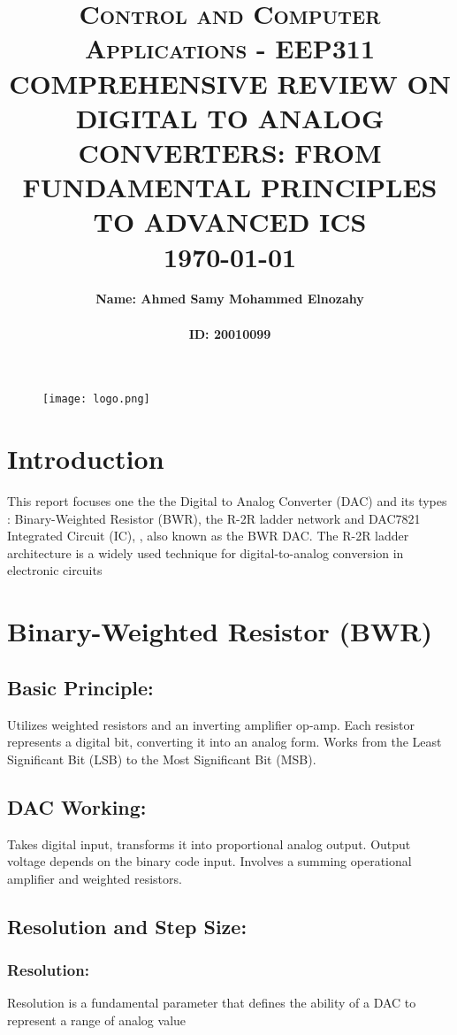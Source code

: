 \documentclass{article}
\title{ \normalsize \textsc{Control and Computer Applications - EEP311}
		\\ [2.0cm]
		\HRule{4pt} 
		\LARGE \textbf{\uppercase{Comprehensive Review on Digital to Analog Converters: From Fundamental Principles to Advanced ICs}}
		\HRule{2pt} \\[0.5cm]
		\normalsize \today \vspace*{5\baselineskip}}
\date{}
\author{
\fontsize{14}{16}\selectfont\textbf{Name: Ahmed Samy Mohammed Elnozahy}\\
\\
		\fontsize{14}{16}\selectfont\textbf{ID: 20010099} \\
  }
\begin{document}
\begin{figure}
    \centering
    \texttt{[image: logo.png]}
\end{figure}
\maketitle




\newpage
\tableofcontents
\newpage
\section{Introduction}
\fontsize{14}{16}\selectfont
This report focuses one the the Digital to Analog Converter (DAC) and its types : Binary-Weighted Resistor (BWR), the R-2R ladder network and DAC7821 Integrated Circuit (IC), , also known as the BWR DAC. The R-2R ladder architecture is a widely used technique for digital-to-analog conversion in electronic circuits

\section{Binary-Weighted Resistor (BWR)}
\fontsize{14}{16}\selectfont
\subsection{Basic Principle:}

Utilizes weighted resistors and an inverting amplifier op-amp.
Each resistor represents a digital bit, converting it into an analog form.
Works from the Least Significant Bit (LSB) to the Most Significant Bit (MSB).

\subsection{DAC Working:}

Takes digital input, transforms it into proportional analog output.
Output voltage depends on the binary code input.
Involves a summing operational amplifier and weighted resistors.

\subsection{Resolution and Step Size:}

\subsubsection{Resolution:}
Resolution is a fundamental parameter that defines the ability of a DAC to represent a range of analog value
\end{document}
